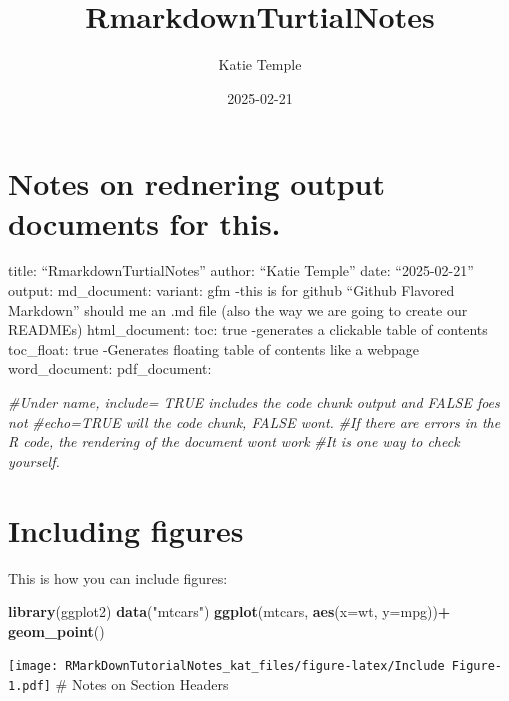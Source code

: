 \documentclass[
]{article}
\title{RmarkdownTurtialNotes}
\author{Katie Temple}
\date{2025-02-21}
\newenvironment{Shaded}{\begin{snugshade}}{\end{snugshade}}
\newcommand{\AttributeTok}[1]{\textcolor[rgb]{0.13,0.29,0.53}{#1}}
\newcommand{\CommentTok}[1]{\textcolor[rgb]{0.56,0.35,0.01}{\textit{#1}}}
\newcommand{\FunctionTok}[1]{\textcolor[rgb]{0.13,0.29,0.53}{\textbf{#1}}}
\newcommand{\NormalTok}[1]{#1}
\newcommand{\SpecialCharTok}[1]{\textcolor[rgb]{0.81,0.36,0.00}{\textbf{#1}}}
\newcommand{\StringTok}[1]{\textcolor[rgb]{0.31,0.60,0.02}{#1}}
\begin{document}
\maketitle

\section{Notes on rednering output documents for
this.}\label{notes-on-rednering-output-documents-for-this.}

title: ``RmarkdownTurtialNotes'' author: ``Katie Temple'' date:
``2025-02-21'' output: md\_document: variant: gfm -this is for github
``Github Flavored Markdown'' should me an .md file (also the way we are
going to create our READMEs) html\_document: toc: true -generates a
clickable table of contents toc\_float: true -Generates floating table
of contents like a webpage word\_document: pdf\_document:

\begin{Shaded}
\begin{Highlighting}[]
\CommentTok{\#Under name, include= TRUE  includes the code chunk output and FALSE foes not}
\CommentTok{\#echo=TRUE will the code chunk, FALSE won\textquotesingle{}t.}
\CommentTok{\#If there are errors in the R code, the rendering of the document won\textquotesingle{}t work}
\CommentTok{\#It is one way to check yourself.}
\end{Highlighting}
\end{Shaded}

\section{Including figures}\label{including-figures}

This is how you can include figures:

\begin{Shaded}
\begin{Highlighting}[]
\FunctionTok{library}\NormalTok{(ggplot2)}
\FunctionTok{data}\NormalTok{(}\StringTok{"mtcars"}\NormalTok{)}
\FunctionTok{ggplot}\NormalTok{(mtcars, }\FunctionTok{aes}\NormalTok{(}\AttributeTok{x=}\NormalTok{wt, }\AttributeTok{y=}\NormalTok{mpg))}\SpecialCharTok{+}
  \FunctionTok{geom\_point}\NormalTok{()}
\end{Highlighting}
\end{Shaded}

\texttt{[image: RMarkDownTutorialNotes\_kat\_files/figure-latex/Include Figure-1.pdf]}
\# Notes on Section Headers
\end{document}
